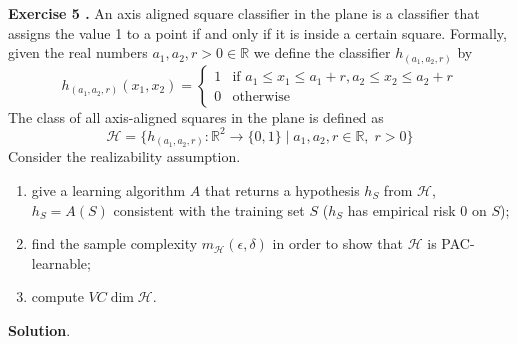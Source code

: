 \documentclass{article}
\newcommand{\<}{\langle}
\renewcommand{\>}{\rangle}
\theoremstyle{definition}
\def\gH{{\mathcal{H}}}
\def\sR{{\mathbb{R}}}
\newcommand{\vcd}[1]{VC \dim{#1}}
\newcommand{\szo}{\{0, 1\}}
\newcommand{\epd}{(\epsilon, \delta)}
\newcommand{\vcd}[1]{\text{VCdim}(#1)}
\newcommand{\vch}{\vcd{\gH}}
\newcommand{\szo}{\{0, 1\}}
\newcommand{\epd}{(\epsilon, \delta)}
\newcommand{\col}{\colon}
\newcommand{\ra}{\rightarrow}
\begin{document}
\textbf{Exercise 5 .} An axis aligned square classifier in the plane is a classifier that assigns the value 1 to a point if and only if it is inside a certain square. Formally, given the real numbers $a_1, a_2, r > 0 \in \sR$ we define the classifier $h_{(a_1, a_2, r)}$ by
\[
h_{(a_1, a_2, r)}(x_1, x_2) = 
\begin{cases}
  1 & \text{if } a_1 \leq x_1 \leq a_1+r, a_2 \leq x_2 \leq a_2+r \\
  0 & \text{otherwise}
\end{cases}
\]
The class of all axis-aligned squares in the plane is defined as
\[\gH = \{h_{(a_1, a_2, r)} \col \sR^2 \ra \szo \mid a_1, a_2, r \in \sR,\; r > 0\}\]
Consider the realizability assumption.
\begin{enumerate}[label=\textbf{\alph*.},ref=\alph*)]
\item \label{4:a} give a learning algorithm $A$ that returns a hypothesis $h_S$ from
$\gH$, $h_S = A(S)$ consistent with the training set $S$ ($h_S$ has empirical risk 0 on $S$);
\item\label{4:b} find the sample complexity $m_{\gH}\epd$ in order to show that $\gH$ is
PAC-learnable;
\item\label{4:c} compute $\vch$.
\end{enumerate}

\textbf{Solution}.
\end{document}
